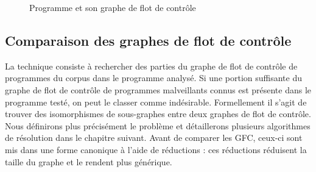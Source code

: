 \begin{figure}[h]
\begin{center}
\end{center}
\caption{Programme et son graphe de flot de contrôle}
\label{fig:am_prog}
\end{figure}



\subsection{Comparaison des graphes de flot de contrôle}
La technique consiste à rechercher des parties du graphe de flot de contrôle de programmes du corpus dans le programme analysé.
Si une portion suffisante du graphe de flot de contrôle de programmes malveillants connus est présente dans le programme testé, on peut le classer comme indésirable. Formellement il s'agit de trouver des isomorphismes de sous-graphes entre deux graphes de flot de contrôle. Nous définirons plus précisément le problème et détaillerons plusieurs algorithmes de résolution dans le chapitre suivant. Avant de comparer les GFC, ceux-ci sont mis dans une forme canonique à l'aide de réductions : ces réductions réduisent la taille du graphe et le rendent plus générique.

